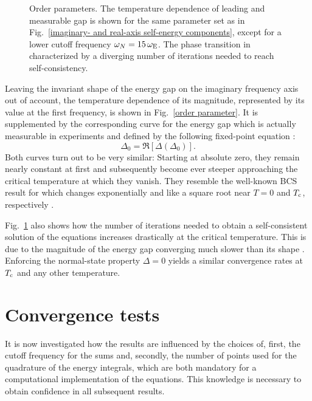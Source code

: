 \begin{figure}
    \small
    \centering
    
    \caption[Temperature dependence of the order parameter]{
        Order parameters. The temperature dependence of leading 
        and measurable gap is shown for the same parameter set as in
        Fig.~\ref{imaginary- and real-axis self-energy components}, except for a
        lower cutoff frequency $\omega_N = 15 \, \omega \sb{\text{E}}$. The phase
        transition in characterized by a diverging number of iterations needed
        to reach self-consistency.}
    \label{order parameter}
\end{figure}
%
Leaving the invariant shape of the energy gap on the imaginary frequency axis
out of account, the temperature dependence of its magnitude, represented by its
value at the first  frequency, is shown in Fig.~\ref{order
parameter}. It is supplemented by the corresponding curve for the energy gap
which is actually measurable in experiments and defined by the following
fixed-point equation \cite[Eq.~3a]{VidbergSerene77}:
%
\begin{equation*}
    \Delta_0 = \Re[\Delta(\Delta_0)].
\end{equation*}
%
Both curves turn out to be very similar: Starting at absolute zero, they remain
nearly constant at first and subsequently become ever steeper approaching the
critical temperature at which they vanish. They resemble the well-known BCS
result for which changes exponentially and like a square root near $T = 0$ and
$T \sb{\text{c}}$, respectively \cite[Eq.~11.60]{Czycholl08}.

Fig.~\ref{order parameter} also shows how the number of iterations needed to
obtain a self-consistent solution of the  equations increases
drastically at the critical temperature. This is due to the magnitude of the
energy gap converging much slower than its shape \cite[185]{VidbergSerene77}.
Enforcing the normal-state property $\Delta = 0$ yields a similar convergence
rates at $T \sb{\text{c}}$ and any other temperature.

\section{Convergence tests}

It is now investigated how the results are influenced by the choices of, first,
the cutoff frequency for the  sums and, secondly, the number of
points used for the quadrature of the energy integrals, which are both mandatory
for a computational implementation of the  equations. This
knowledge is necessary to obtain confidence in all subsequent results.

